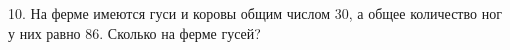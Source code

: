10. На ферме имеются гуси и коровы общим числом 30, а общее количество ног у них равно 86. Сколько на ферме гусей?\\
